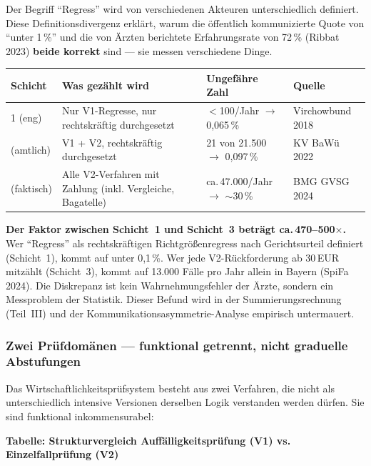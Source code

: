 \documentclass{umbruch-position}
\begin{document}
Der Begriff ``Regress'' wird von verschiedenen Akteuren unterschiedlich definiert. Diese Definitionsdivergenz erklärt, warum die öffentlich kommunizierte Quote von ``unter 1\,\%'' und die von Ärzten berichtete Erfahrungsrate von 72\,\% (Ribbat 2023) \textbf{beide korrekt} sind --- sie messen verschiedene Dinge.

\medskip
{\small
\begin{tabularx}{\textwidth}{l p{5.5cm} l l}
\toprule
\textbf{Schicht} & \textbf{Was gezählt wird} & \textbf{Ungefähre Zahl} & \textbf{Quelle} \\
\midrule
1 (eng) & Nur V1-Regresse, nur rechtskräftig durchgesetzt & ${<}$100/Jahr $\to$ 0,065\,\% & Virchowbund 2018 \\
\addlinespace
2 (amtlich) & V1 + V2, rechtskräftig durchgesetzt & 21 von 21.500 $\to$ 0,097\,\% & KV BaWü 2022 \\
\addlinespace
3 (faktisch) & Alle V2-Verfahren mit Zahlung (inkl. Vergleiche, Bagatelle) & ca.\,47.000/Jahr $\to$ ${\sim}$30\,\% & BMG GVSG 2024 \\
\bottomrule
\end{tabularx}
}

\medskip
\noindent\textbf{Der Faktor zwischen Schicht~1 und Schicht~3 beträgt ca.\,470--500$\times$.} Wer ``Regress'' als rechtskräftigen Richtgrößenregress nach Gerichtsurteil definiert (Schicht~1), kommt auf unter 0,1\,\%. Wer jede V2-Rückforderung ab 30\,EUR mitzählt (Schicht~3), kommt auf 13.000 Fälle pro Jahr allein in Bayern (SpiFa 2024). Die Diskrepanz ist kein Wahrnehmungsfehler der Ärzte, sondern ein Messproblem der Statistik. Dieser Befund wird in der Summierungsrechnung (Teil~III) und der Kommunikationsasymmetrie-Analyse empirisch untermauert.

\subsubsection*{Zwei Prüfdomänen --- funktional getrennt, nicht graduelle Abstufungen}

Das Wirtschaftlichkeitsprüfsystem besteht aus zwei Verfahren, die nicht als unterschiedlich intensive Versionen derselben Logik verstanden werden dürfen. Sie sind funktional inkommensurabel:

\medskip\noindent\textbf{Tabelle: Strukturvergleich Auffälligkeitsprüfung (V1) vs. Einzelfallprüfung (V2)}
\end{document}
